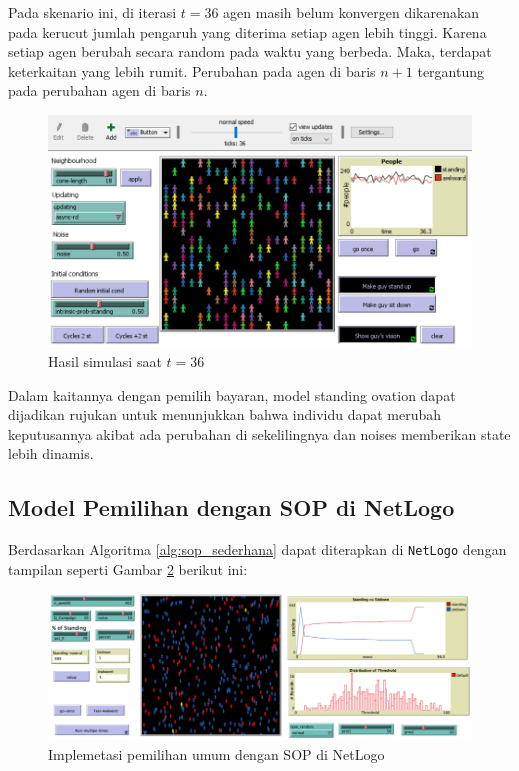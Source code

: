 Pada skenario ini, di iterasi $t=36$ agen masih belum konvergen dikarenakan pada kerucut jumlah pengaruh yang diterima setiap agen lebih tinggi. Karena setiap agen berubah secara random pada waktu yang berbeda. Maka, terdapat keterkaitan yang lebih rumit. Perubahan pada agen di baris $n+1$ tergantung pada perubahan agen di baris $n$.

\begin{figure}[H]
\centering
\includegraphics[width=\linewidth]{images/ch03/sop16}
\caption{Hasil simulasi saat $t=36$}
\label{fig:sop13}
\end{figure}

Dalam kaitannya dengan pemilih bayaran, model standing ovation dapat dijadikan rujukan untuk menunjukkan bahwa individu dapat merubah keputusannya akibat ada perubahan di sekelilingnya dan noises memberikan state lebih dinamis.

\subsection{Model Pemilihan dengan SOP di NetLogo}

Berdasarkan Algoritma \ref{alg:sop_sederhana} dapat diterapkan di \texttt{NetLogo} dengan tampilan seperti Gambar \ref{fig:pemilusop1} berikut ini:

\begin{figure}[H]
\centering
\includegraphics[width=\linewidth]{images/ch03/pemilusop1}
\caption{Implemetasi pemilihan umum dengan SOP di NetLogo}
\label{fig:pemilusop1}
\end{figure}

